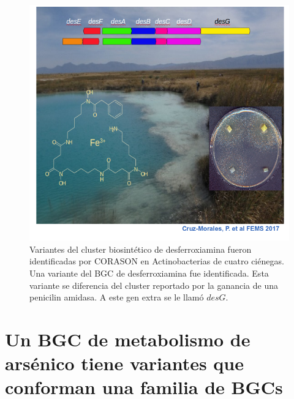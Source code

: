 \documentclass[12pt,twoside]{reedthesis}
\begin{document}
  \begin{figure}[h!tbp]
  \centering
  \includegraphics[angle = 0,scale = .4]{chapter3/des.png}
  \caption[EvoMining Algorithm]{\footnotesize{Variantes del cluster biosintético de desferroxiamina fueron identificadas por CORASON en Actinobacterias de cuatro ciénegas. Una variante del BGC de desferroxiamina fue identificada. Esta variante se diferencia del cluster reportado por la ganancia de una penicilin amidasa. A este gen extra se le llamó $desG$.}}
  \label{fig:des}
  \end{figure}
  
  \section{Un BGC de metabolismo de arsénico tiene variantes que conforman
  una familia de
  BGCs}\label{un-bgc-de-metabolismo-de-arsenico-tiene-variantes-que-conforman-una-familia-de-bgcs}
  
\end{document}
